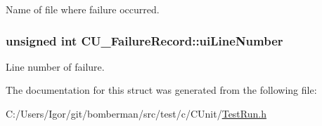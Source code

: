 Name of file where failure occurred. 

\hypertarget{struct_c_u___failure_record_a124d4ce97d29bae29f952250da03536b}{
\subsubsection[{ui\+Line\+Number}]{\setlength{\rightskip}{0pt plus 5cm}unsigned int C\+U\+\_\+\+Failure\+Record\+::ui\+Line\+Number}}\label{struct_c_u___failure_record_a124d4ce97d29bae29f952250da03536b}


Line number of failure. 



The documentation for this struct was generated from the following file\+:\begin{DoxyCompactItemize}
\item 
C\+:/\+Users/\+Igor/git/bomberman/src/test/c/\+C\+Unit/\hyperlink{_test_run_8h}{Test\+Run.\+h}\end{DoxyCompactItemize}
